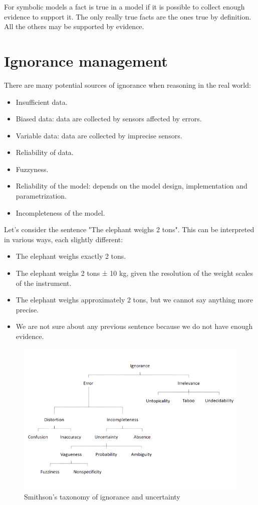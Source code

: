 \documentclass[12pt, a4paper]{report}
\newtheorem[style=M,bodystyle=\normalfont]{theorem}{Theorem}
\newtheorem[style=M,bodystyle=\normalfont]{corollary}{Corollary}
\newtheorem[style=M,bodystyle=\normalfont]{lemma}{Lemma}
\newtheorem[style=M,bodystyle=\normalfont]{definition}{Definition}
\begin{document}
    For symbolic models a fact is true in a model if it is possible to collect enough evidence to support it. The only really true facts 
    are the ones true by definition. All the others may be supported by evidence. 
    
    \section{Ignorance management}
    There are many potential sources of ignorance when reasoning in the real world:
    \begin{itemize}
        \item Insufficient data.
        \item Biased data: data are collected by sensors affected by errors. 
        \item Variable data: data are collected by imprecise sensors.
        \item Reliability of data. 
        \item Fuzzyness. 
        \item Reliability of the model: depends on the model design, implementation and parametrization. 
        \item Incompleteness of the model. 
    \end{itemize}
    \begin{example}
        Let's consider the sentence "The elephant weighs 2 tons". This can be interpreted in various ways, each slightly different:
        \begin{itemize}
            \item The elephant weighs exactly 2 tons.
            \item The elephant weighs 2 tons ± 10 kg, given the resolution of the weight scales of the instrument.
            \item The elephant weighs approximately 2 tons, but we cannot say anything more precise.
            \item We are not sure about any previous sentence because we do not have enough evidence.
        \end{itemize}
    \end{example}
    \begin{figure}[H]
        \centering
        \includegraphics[width=1\linewidth]{images/smithson.png}
        \caption{Smithson's taxonomy of ignorance and uncertainty}
    \end{figure}
\end{document}
